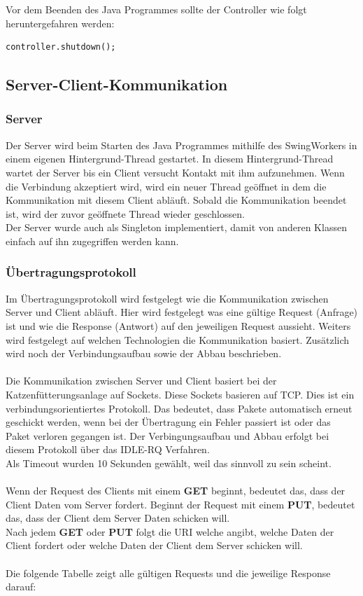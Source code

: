 Vor dem Beenden des Java Programmes sollte der Controller wie folgt heruntergefahren werden:
\begin{lstlisting}[style=JavaStyle, caption=Controller herunterfahren]
	controller.shutdown();
\end{lstlisting}

\subsection{Server-Client-Kommunikation}
\subsubsection{Server}
Der Server wird beim Starten des Java Programmes mithilfe des SwingWorkers in einem eigenen Hintergrund-Thread gestartet. In diesem Hintergrund-Thread wartet der Server bis ein Client versucht Kontakt mit ihm aufzunehmen. Wenn die Verbindung akzeptiert wird, wird ein neuer Thread geöffnet in dem die Kommunikation mit diesem Client abläuft. Sobald die Kommunikation beendet ist, wird der zuvor geöffnete Thread wieder geschlossen. 
\\ Der Server wurde auch als Singleton implementiert, damit von anderen Klassen einfach auf ihn zugegriffen werden kann.

\subsubsection{Übertragungsprotokoll}
Im Übertragungsprotokoll wird festgelegt wie die Kommunikation zwischen Server und Client abläuft. Hier wird festgelegt was eine gültige Request (Anfrage) ist und wie die Response (Antwort) auf den jeweiligen Request aussieht. Weiters wird festgelegt auf welchen Technologien die Kommunikation basiert. Zusätzlich wird noch der Verbindungsaufbau sowie der Abbau beschrieben.
\\ \\
Die Kommunikation zwischen Server und Client basiert bei der Katzenfütterungsanlage auf Sockets. Diese Sockets basieren auf \ac{TCP}. Dies ist ein verbindungsorientiertes Protokoll. Das bedeutet, dass Pakete automatisch erneut geschickt werden, wenn bei der Übertragung ein Fehler passiert ist oder das Paket verloren gegangen ist. Der Verbingungsaufbau und Abbau erfolgt bei diesem Protokoll über das IDLE-RQ Verfahren.
\\ Als Timeout wurden 10 Sekunden gewählt, weil das sinnvoll zu sein scheint.
\\ \\
Wenn der Request des Clients mit einem \textbf{GET} beginnt, bedeutet das, dass der Client Daten vom Server fordert. Beginnt der Request mit einem \textbf{PUT}, bedeutet das, dass der Client dem Server Daten schicken will.
\\ Nach jedem \textbf{GET} oder \textbf{PUT} folgt die URI welche angibt, welche Daten der Client fordert oder welche Daten der Client dem Server schicken will.
\\ \\
Die folgende Tabelle zeigt alle gültigen Requests und die jeweilige Response darauf:

